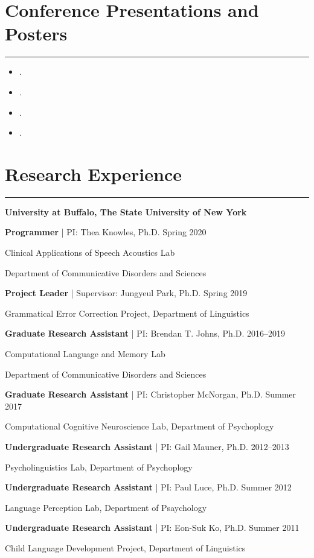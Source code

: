 \documentclass[11pt]{article}
\newcommand{\cvsection}[1]{\vspace{-0.2cm}\section*{\Large #1}\vspace{-0.2cm}\hrule\vspace{0.2cm}}
\begin{document}
\cvsection{Conference Presentations and Posters}

\begin{itemize}[leftmargin=!,labelindent=!,itemindent=-15pt]
    \setlength\itemsep{0.3em}

    \item[] .
    \item[] .
    \item[] .
    \item[] .

\end{itemize}


\cvsection{Research Experience}

\textbf{University at Buffalo, The State University of New York}

\textbf{Programmer} | PI: Thea Knowles, Ph.D. \hfill Spring 2020

\quad Clinical Applications of Speech Acoustics Lab

\quad Department of Communicative Disorders and Sciences

\textbf{Project Leader} | Supervisor: Jungyeul Park, Ph.D. \hfill Spring 2019

\quad Grammatical Error Correction Project, Department of Linguistics

\textbf{Graduate Research Assistant} | PI: Brendan T. Johns, Ph.D. \hfill 2016--2019

\quad Computational Language and Memory Lab

\quad Department of Communicative Disorders and Sciences

\textbf{Graduate Research Assistant} | PI: Christopher McNorgan, Ph.D. \hfill Summer 2017

\quad Computational Cognitive Neuroscience Lab, Department of Psychoplogy

\textbf{Undergraduate Research Assistant} | PI: Gail Mauner, Ph.D. \hfill 2012--2013

\quad Psycholinguistics Lab, Department of Psychoplogy

\textbf{Undergraduate Research Assistant} | PI: Paul Luce, Ph.D. \hfill Summer 2012

\quad Language Perception Lab, Department of Psaychology

\textbf{Undergraduate Research Assistant} | PI: Eon-Suk Ko, Ph.D. \hfill Summer 2011

\quad Child Language Development Project, Department of Linguistics
\end{document}
